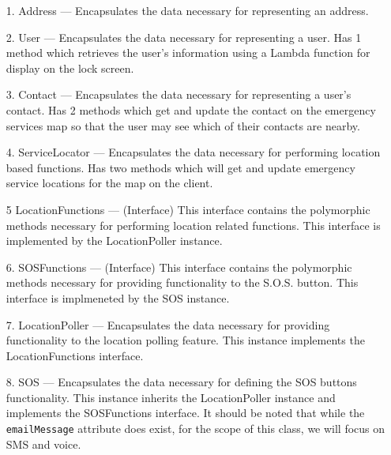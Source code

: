 \documentclass[10pt, a4paper]{article}
\begin{document}
\begin{enumerate}
\item[1.] Address --- Encapsulates the data necessary for representing an address.
\item[2.] User --- Encapsulates the data necessary for representing a user. Has 1 method which retrieves the user's information using a Lambda function for display on the lock screen.
\item[3.] Contact --- Encapsulates the data necessary for representing a user's contact. Has 2 methods which get and update the contact on the emergency services map so that the user may see which of their contacts are nearby.
\item[4.] ServiceLocator --- Encapsulates the data necessary for performing location based functions. Has two methods which will get and update emergency service locations for the map on the client.
\item[5] LocationFunctions --- (Interface) This interface contains the polymorphic methods necessary for performing location related functions. This interface is implemented by the LocationPoller instance.
\item[6.] SOSFunctions --- (Interface) This interface contains the polymorphic methods necessary for providing functionality to the S.O.S. button. This interface is implmeneted by the SOS instance.
\item[7.] LocationPoller --- Encapsulates the data necessary for providing functionality to the location polling feature. This instance implements the LocationFunctions interface.
\item[8.] SOS --- Encapsulates the data necessary for defining the SOS buttons functionality. This instance inherits the LocationPoller instance and implements the SOSFunctions interface. It should be noted that while the \texttt{emailMessage} attribute does exist, for the scope of this class, we will focus on SMS and voice.
\end{enumerate}
\end{document}
